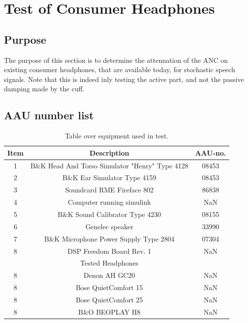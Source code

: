 
\section{Test of Consumer Headphones}
\subsection{Purpose}
The purpose of this section is to determine the attenuation of the ANC on existing consumer headphones, that are available today, for stochastic speech signals.
Note that this is indeed inly testing the active part, and not the passive damping made by the cuff.


\subsection{AAU number list}
\begin{table}[H]
	\centering
	\begin{tabular}{ c c c } \toprule
	{Item}	&	{Description} 								& {AAU-no}. \\ 
								\bottomrule 
		1	&	B\&K Head And Torso Simulator "Henry" Type 4128	& 08453	\\
		2	&	B\&K Ear Simulator Type 4159				& 08453		\\
		3	&	Soundcard RME Fireface 802					& 86838		\\
		4	&	Computer running simulink					& NaN		\\
		5	&	B\&K Sound Calibrator Type 4230				& 08155		\\ 
		6	&	Genelec speaker								& 33990		\\ 
		7	& 	B\&K Microphone Power Supply Type 2804		& 07304		\\
		8	&	DSP Freedom Board Rev. 1 					& NaN		\\
								\bottomrule
							& Tested Headphones 			& 			\\
								\bottomrule
		8	& Denon AH GC20 								& NaN 		\\
		8	& Bose QuietComfort 15 							& NaN 		\\
		8	& Bose QuietComfort 25						 	& NaN		\\
		8	& B\&O BEOPLAY H8 								& NaN		\\
								\bottomrule
	\end{tabular}
	\caption{Table over equipment used in test.}
	\label{tab:UsedEquipmentListConsumerHP}
\end{table}

